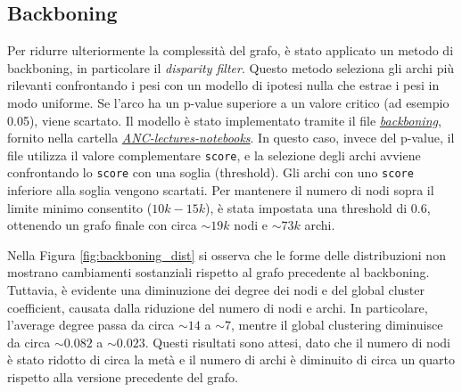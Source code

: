 \documentclass[sigchi]{acmart}
\begin{document}
\subsection{Backboning}
Per ridurre ulteriormente la complessità del grafo, è stato applicato un metodo di backboning, in particolare il \textit{disparity filter}. Questo metodo seleziona gli archi più rilevanti confrontando i pesi con un modello di ipotesi nulla che estrae i pesi in modo uniforme. Se l'arco ha un p-value superiore a un valore critico (ad esempio 0.05), viene scartato. Il modello è stato implementato tramite il file \href{https://github.com/sna-unipi/ANC-lectures-notebooks/blob/main/backboning.py}{\textit{backboning}}, fornito nella cartella \href{https://github.com/sna-unipi/ANC-lectures-notebooks}{\textit{ANC-lectures-notebooks}}. In questo caso, invece del p-value, il file utilizza il valore complementare \texttt{score}, e la selezione degli archi avviene confrontando lo \texttt{score} con una soglia (threshold). Gli archi con uno \texttt{score} inferiore alla soglia vengono scartati. Per mantenere il numero di nodi sopra il limite minimo consentito ($10k-15k$), è stata impostata una threshold di $0.6$, ottenendo un grafo finale con circa $\sim19k$ nodi e $\sim73k$ archi.

Nella Figura \ref{fig:backboning_dist} si osserva che le forme delle distribuzioni non mostrano cambiamenti sostanziali rispetto al grafo precedente al backboning. Tuttavia, è evidente una diminuzione dei degree dei nodi e del global cluster coefficient, causata dalla riduzione del numero di nodi e archi. In particolare, l'average degree passa da circa $\sim 14$ a $\sim 7$, mentre il global clustering diminuisce da circa $\sim 0.082$ a $\sim 0.023$. Questi risultati sono attesi, dato che il numero di nodi è stato ridotto di circa la metà e il numero di archi è diminuito di circa un quarto rispetto alla versione precedente del grafo.
\end{document}
